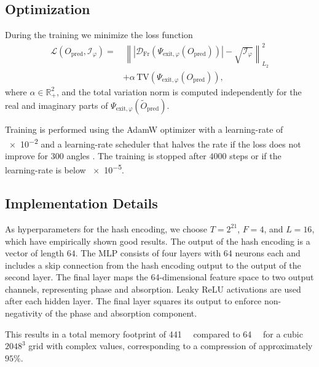 \documentclass{article}
\begin{document}
\subsection{Optimization}
During the training we minimize the loss function 
\begin{equation}
	\begin{split}
\mathcal{L}\!\left( O_{\mathrm{pred}}, \mathcal{I}_\varphi \right)
 = &\, 
 \left\|
 \left|
 \mathcal{D}_{\mathrm{Fr}}\!\left(
 \Psi_{\mathrm{exit}, \varphi}\!\left(
 O_{\mathrm{pred}}
 \right)
 \right)
 \right|
 -
 \sqrt{\mathcal{I}_\varphi}
 \right\|_{L_{2}}^{2} \\[0.5em]
   & + \alpha\, \mathrm{TV}\!\left(
 \Psi_{\mathrm{exit}, \varphi}\!\left(
 O_{\mathrm{pred}}
 \right)
 \right),
 \label{eq:loss}
\end{split}
\end{equation}
where $\alpha \in \mathbb{R}_{+}^{2}$, and the total variation norm is computed independently for the real and imaginary parts of $\Psi_{\mathrm{exit}, \varphi}\!\left( \tilde{O}_{\mathrm{pred}} \right)$.  
 
Training is performed using the AdamW optimizer with a learning-rate of \num{e-2} and a learning-rate scheduler that halves the rate if the loss does not improve for $300$ angles \cite{loshchilovDecoupledWeightDecay2019}.
The training is stopped after $4000$ steps or if the learning-rate is below \num{e-5}.


\subsection{Implementation Details}
As hyperparameters for the hash encoding, we choose $T = 2^{21}$, $F = 4$, and $L = 16$, which have empirically shown good results.  
The output of the hash encoding is a vector of length $64$.  
The MLP consists of four layers with 64 neurons each and includes a skip connection from the hash encoding output to the output of the second layer.  
The final layer maps the 64-dimensional feature space to two output channels, representing phase and absorption.  
Leaky ReLU activations are used after each hidden layer.  
The final layer squares its output to enforce non-negativity of the phase and absorption component.  

This results in a total memory footprint of \qty{441}{\mega\byte} compared to \qty{64}{\gibi\byte} for a cubic $2048^3$ grid with complex values, corresponding to a compression of approximately $95\%$.  
\end{document}
